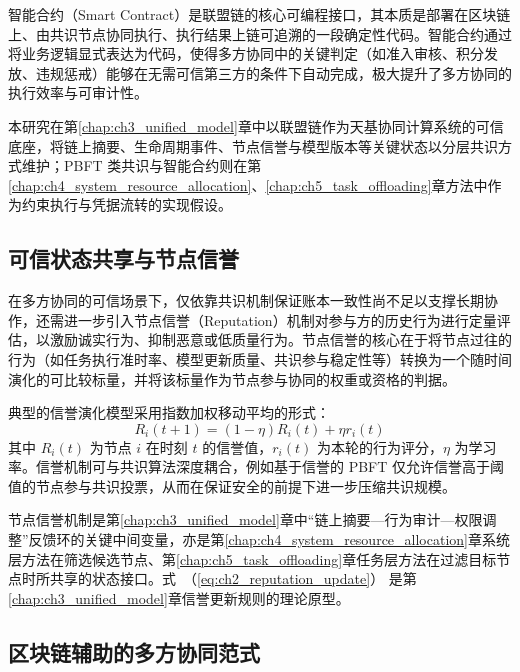 智能合约（Smart Contract）是联盟链的核心可编程接口，其本质是部署在区块链上、由共识节点协同执行、执行结果上链可追溯的一段确定性代码。智能合约通过将业务逻辑显式表达为代码，使得多方协同中的关键判定（如准入审核、积分发放、违规惩戒）能够在无需可信第三方的条件下自动完成，极大提升了多方协同的执行效率与可审计性\cite{Androulaki2018Fabric,Villegas2025BETAC}。

本研究在第\ref{chap:ch3_unified_model}章中以联盟链作为天基协同计算系统的可信底座，将链上摘要、生命周期事件、节点信誉与模型版本等关键状态以分层共识方式维护；PBFT 类共识与智能合约则在第\ref{chap:ch4_system_resource_allocation}、\ref{chap:ch5_task_offloading}章方法中作为约束执行与凭据流转的实现假设。

\subsection{可信状态共享与节点信誉}
\label{subsec:ch2_reputation}

在多方协同的可信场景下，仅依靠共识机制保证账本一致性尚不足以支撑长期协作，还需进一步引入节点信誉（Reputation）机制对参与方的历史行为进行定量评估，以激励诚实行为、抑制恶意或低质量行为\cite{NetTopoBFT2025,ETSI2024BCFL}。节点信誉的核心在于将节点过往的行为（如任务执行准时率、模型更新质量、共识参与稳定性等）转换为一个随时间演化的可比较标量，并将该标量作为节点参与协同的权重或资格的判据。

典型的信誉演化模型采用指数加权移动平均的形式：
\begin{equation}
  R_i(t+1) = (1-\eta) R_i(t) + \eta r_i(t)
  \label{eq:ch2_reputation_update}
\end{equation}
其中 $R_i(t)$ 为节点 $i$ 在时刻 $t$ 的信誉值，$r_i(t)$ 为本轮的行为评分，$\eta$ 为学习率。信誉机制可与共识算法深度耦合，例如基于信誉的 PBFT 仅允许信誉高于阈值的节点参与共识投票，从而在保证安全的前提下进一步压缩共识规模\cite{NetTopoBFT2025}。

节点信誉机制是第\ref{chap:ch3_unified_model}章中“链上摘要—行为审计—权限调整”反馈环的关键中间变量，亦是第\ref{chap:ch4_system_resource_allocation}章系统层方法在筛选候选节点、第\ref{chap:ch5_task_offloading}章任务层方法在过滤目标节点时所共享的状态接口。式~（\ref{eq:ch2_reputation_update}） 是第\ref{chap:ch3_unified_model}章信誉更新规则的理论原型。

\subsection{区块链辅助的多方协同范式}
\label{subsec:ch2_bc_assisted}


